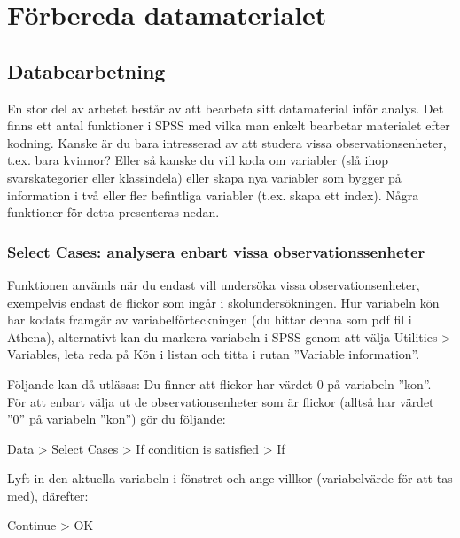 \documentclass[
]{book}
\begin{document}
\hypertarget{part-fuxf6rbereda-datamaterialet}{%
\part*{Förbereda datamaterialet}\label{part-fuxf6rbereda-datamaterialet}}

\hypertarget{databearbetning}{%
\chapter{Databearbetning}\label{databearbetning}}

En stor del av arbetet består av att bearbeta sitt datamaterial inför analys. Det finns ett antal funktioner
i SPSS med vilka man enkelt bearbetar materialet efter kodning. Kanske är du bara intresserad av att
studera vissa observationsenheter, t.ex. bara kvinnor? Eller så kanske du vill koda om variabler (slå ihop
svarskategorier eller klassindela) eller skapa nya variabler som bygger på information i två eller fler
befintliga variabler (t.ex. skapa ett index). Några funktioner för detta presenteras nedan.

\hypertarget{select-cases-analysera-enbart-vissa-observationssenheter}{%
\section{Select Cases: analysera enbart vissa observationssenheter}\label{select-cases-analysera-enbart-vissa-observationssenheter}}

Funktionen används när du endast vill undersöka vissa observationsenheter, exempelvis endast de
flickor som ingår i skolundersökningen. Hur variabeln kön har kodats framgår av variabelförteckningen
(du hittar denna som pdf fil i Athena), alternativt kan du markera variabeln i SPSS
genom att välja Utilities \textgreater{} Variables, leta reda på Kön i listan och titta i rutan ''Variable
information''.

Följande kan då utläsas: Du finner att flickor har värdet 0 på variabeln ''kon''. För att enbart välja ut de observationsenheter som
är flickor (alltså har värdet ''0'' på variabeln ''kon'') gör du följande:

Data \textgreater{} Select Cases \textgreater{} If condition is satisfied \textgreater{} If

Lyft in den aktuella variabeln i fönstret och ange villkor (variabelvärde för att tas med), därefter:

Continue \textgreater{} OK
\end{document}
